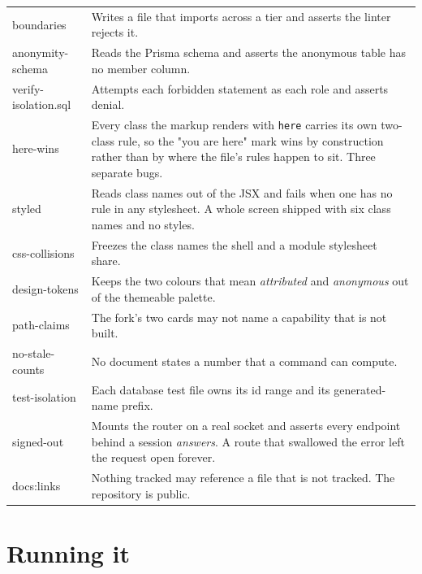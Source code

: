 \documentclass[11pt,a4paper]{article}
\begin{document}
\begin{center}
\sffamily\scriptsize
\begin{tabular}{@{}>{\ttfamily}p{4.3cm} p{9.9cm}@{}}
\toprule
boundaries & Writes a file that imports across a tier and asserts the linter rejects it. \\
anonymity-schema & Reads the Prisma schema and asserts the anonymous table has no member column. \\
verify-isolation.sql & Attempts each forbidden statement as each role and asserts denial. \\
here-wins & Every class the markup renders with \texttt{here} carries its own two-class rule, so the "you are here" mark wins by construction rather than by where the file's rules happen to sit. Three separate bugs. \\
styled & Reads class names out of the JSX and fails when one has no rule in any stylesheet. A whole screen shipped with six class names and no styles. \\
css-collisions & Freezes the class names the shell and a module stylesheet share. \\
design-tokens & Keeps the two colours that mean \emph{attributed} and \emph{anonymous} out of the themeable palette. \\
path-claims & The fork's two cards may not name a capability that is not built. \\
no-stale-counts & No document states a number that a command can compute. \\
test-isolation & Each database test file owns its id range and its generated-name prefix. \\
signed-out & Mounts the router on a real socket and asserts every endpoint behind a session \emph{answers}. A route that swallowed the error left the request open forever. \\
docs:links & Nothing tracked may reference a file that is not tracked. The repository is public. \\
\bottomrule
\end{tabular}
\end{center}


\section{Running it}
\end{document}
